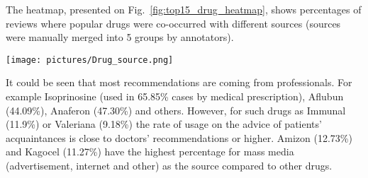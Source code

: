 \documentclass[a4paper,fleqn,longmktitle]{cas-dc}
\begin{document}
The heatmap, presented on Fig.~\ref{fig:top15_drug_heatmap}, shows percentages of reviews where popular drugs were co-occurred with different sources (sources were manually merged into 5 groups by annotators).
\begin{figure*}
    \centering
    \texttt{[image: pictures/Drug\_source.png]}
    \caption{The distribution heatmap of reviews percentages for different sources of information for the 20 most popular drugs. The number in a cell means the percentage of reviews with the drug and particular source to the total number of reviews with this drug. If there were several different sources mentioned, it counted as ``mixed'' source}
    \label{fig:top15_drug_heatmap}
\end{figure*}
It could be seen that most recommendations are coming from professionals. For example Isoprinosine (used in 65.85\% cases by medical prescription), Aflubun (44.09\%), Anaferon (47.30\%) and others. However, for such drugs as Immunal (11.9\%) or Valeriana (9.18\%) the rate of usage on the advice of patients' acquaintances is close to doctors' recommendations or higher. Amizon (12.73\%) and Kagocel (11.27\%) have the highest percentage for mass media (advertisement, internet and other) as the source  compared to other drugs.
\end{document}
